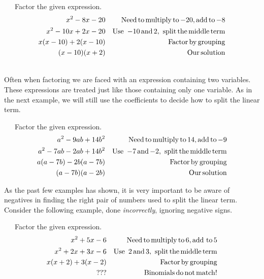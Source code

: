 \begin{example}~~~Factor the given expression.
  \begin{eqnarray*}
    x^2 - 8 x - 20 &  & \operatorname{Need} \operatorname{to} \operatorname{multiply} \operatorname{to} - 20,
    \operatorname{add} \operatorname{to} - 8\\
    x^2 - 10 x + 2 x - 20 &  & \operatorname{Use~}- 10 \operatorname{and} 2, \operatorname{~split} \operatorname{the}
    \operatorname{middle} \operatorname{term}\\
    x (x - 10) + 2 (x - 10) &  & \operatorname{Factor} \operatorname{by} \operatorname{grouping}\\
    (x - 10) (x + 2) &  & \operatorname{Our} \operatorname{solution}
  \end{eqnarray*}
\end{example}	
~\\
Often when factoring we are faced with an expression containing two variables. These expressions are treated just like
those containing only one variable.  As in the next example, we will still use the coefficients to decide how to split the
linear term.

\begin{example}~~~Factor the given expression.
  \begin{eqnarray*}
    a^2 - 9 a b + 14 b^2 &  & \operatorname{Need} \operatorname{to} \operatorname{multiply} \operatorname{to}
    14, \operatorname{add} \operatorname{to} - 9\\
    a^2 - 7 a b - 2 a b + 14 b^2 &  & \operatorname{Use~}- 7 \operatorname{and} - 2, \operatorname{~split}
    \operatorname{the} \operatorname{middle} \operatorname{term}\\
    a (a - 7 b) - 2 b (a - 7 b) &  & \operatorname{Factor} \operatorname{by} \operatorname{grouping}\\
    (a - 7 b) (a - 2 b) &  & \operatorname{Our} \operatorname{solution}
  \end{eqnarray*}
\end{example}	

As the past few examples has shown, it is very important to be aware of
negatives in finding the right pair of numbers used to split the linear term.
Consider the following example, done \textit{incorrectly}, ignoring negative signs.\pp

\begin{example}~~~Factor the given expression.
  \begin{eqnarray*}
    x^2 + 5 x - 6 &  & \operatorname{Need} \operatorname{to} \operatorname{multiply} \operatorname{to} 6,
    \operatorname{add~to} 5\\
    x^2 + 2 x + 3 x - 6 &  & \operatorname{Use~} 2 \operatorname{and} 3, \operatorname{~split} \operatorname{the}
    \operatorname{middle} \operatorname{term}\\
    x (x + 2) + 3 (x - 2) &  & \operatorname{Factor} \operatorname{by} \operatorname{grouping}\\
    ? ? ? &  & \operatorname{Binomials} \operatorname{do} \operatorname{not} \operatorname{match} !
  \end{eqnarray*}
\end{example}

